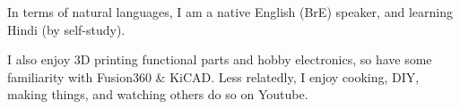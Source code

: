 \nopagebreak
\begin{cvskills}


\end{cvskills}

In terms of natural languages, I am a native English (BrE) speaker, and learning Hindi (by self-study).

I also enjoy 3D printing functional parts and hobby electronics, so have some familiarity with Fusion360 \& KiCAD. Less relatedly, I enjoy cooking, DIY, making things, and watching others do so on Youtube.
